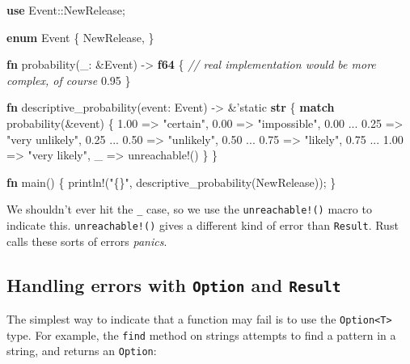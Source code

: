 \documentclass[a4paper,]{book}
\newenvironment{Shaded}{\begin{snugshade}}{\end{snugshade}}
\newcommand{\KeywordTok}[1]{\textcolor[rgb]{0.13,0.29,0.53}{\textbf{{#1}}}}
\newcommand{\DecValTok}[1]{\textcolor[rgb]{0.00,0.00,0.81}{{#1}}}
\newcommand{\StringTok}[1]{\textcolor[rgb]{0.31,0.60,0.02}{{#1}}}
\newcommand{\CommentTok}[1]{\textcolor[rgb]{0.56,0.35,0.01}{\textit{{#1}}}}
\newcommand{\OtherTok}[1]{\textcolor[rgb]{0.56,0.35,0.01}{{#1}}}
\newcommand{\NormalTok}[1]{{#1}}
\begin{document}
\begin{Shaded}
\begin{Highlighting}[]
\KeywordTok{use} \NormalTok{Event::NewRelease;}

\KeywordTok{enum} \NormalTok{Event \{}
    \NormalTok{NewRelease,}
\NormalTok{\}}

\KeywordTok{fn} \NormalTok{probability(_: &Event) -> }\KeywordTok{f64} \NormalTok{\{}
    \CommentTok{// real implementation would be more complex, of course}
    \DecValTok{0.95}
\NormalTok{\}}

\KeywordTok{fn} \NormalTok{descriptive_probability(event: Event) -> &}\OtherTok{'static} \KeywordTok{str} \NormalTok{\{}
    \KeywordTok{match} \NormalTok{probability(&event) \{}
        \DecValTok{1.00} \NormalTok{=> }\StringTok{"certain"}\NormalTok{,}
        \DecValTok{0.00} \NormalTok{=> }\StringTok{"impossible"}\NormalTok{,}
        \DecValTok{0.00} \NormalTok{... }\DecValTok{0.25} \NormalTok{=> }\StringTok{"very unlikely"}\NormalTok{,}
        \DecValTok{0.25} \NormalTok{... }\DecValTok{0.50} \NormalTok{=> }\StringTok{"unlikely"}\NormalTok{,}
        \DecValTok{0.50} \NormalTok{... }\DecValTok{0.75} \NormalTok{=> }\StringTok{"likely"}\NormalTok{,}
        \DecValTok{0.75} \NormalTok{... }\DecValTok{1.00} \NormalTok{=> }\StringTok{"very likely"}\NormalTok{,}
        \NormalTok{_ => }\OtherTok{unreachable!}\NormalTok{()}
    \NormalTok{\}}
\NormalTok{\}}

\KeywordTok{fn} \NormalTok{main() \{}
    \OtherTok{println!}\NormalTok{(}\StringTok{"\{\}"}\NormalTok{, descriptive_probability(NewRelease));}
\NormalTok{\}}
\end{Highlighting}
\end{Shaded}

We shouldn't ever hit the \texttt{\_} case, so we use the
\texttt{unreachable!()} macro to indicate this. \texttt{unreachable!()}
gives a different kind of error than \texttt{Result}. Rust calls these
sorts of errors \emph{panics}.

\subsection{\texorpdfstring{Handling errors with \texttt{Option} and
\texttt{Result}}{Handling errors with Option and Result}}\label{handling-errors-with-option-and-result}

The simplest way to indicate that a function may fail is to use the
\texttt{Option\textless{}T\textgreater{}} type. For example, the
\texttt{find} method on strings attempts to find a pattern in a string,
and returns an \texttt{Option}:
\end{document}
